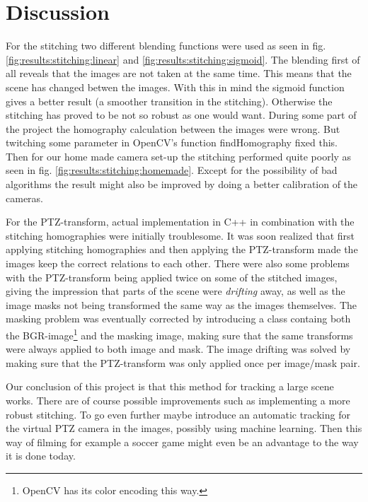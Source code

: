 \section{Discussion}
For the stitching two different blending functions were used as seen in fig. \ref{fig:results:stitching:linear} and \ref{fig:results:stitching:sigmoid}.
The blending first of all reveals that the images are not taken at the same time.
This means that the scene has changed betwen the images.
With this in mind the sigmoid function gives a better result (a smoother transition in the stitching).
Otherwise the stitching has proved to be not so robust as one would want.
During some part of the project the homography calculation between the images were wrong.
But twitching some parameter in OpenCV's function findHomography fixed this.
Then for our home made camera set-up the stitching performed quite poorly as seen in fig. \ref{fig:results:stitching:homemade}.
Except for the possibility of bad algorithms the result might also be improved by doing a better calibration of the cameras.

For the PTZ-transform, actual implementation in C++ in combination with the stitching homographies were initially troublesome.
It was soon realized that first applying stitching homographies and then applying the PTZ-transform made the images keep the correct relations to each other.
There were also some problems with the PTZ-transform being applied twice on some of the stitched images, giving the impression that parts of the scene were {\it drifting} away, as well as the image masks not being transformed the same way as the images themselves.
The masking problem was eventually corrected by introducing a class containg both the BGR-image\footnote{OpenCV has its color encoding this way.} and the masking image, making sure that the same transforms were always applied to both image and mask.
The image drifting was solved by making sure that the PTZ-transform was only applied once per image/mask pair.

Our conclusion of this project is that this method for tracking a large scene works.
There are of course possible improvements such as implementing a more robust stitching.
To go even further maybe introduce an automatic tracking for the virtual PTZ camera in the images, possibly using machine learning.
Then this way of filming for example a soccer game might even be an advantage to the way it is done today.
